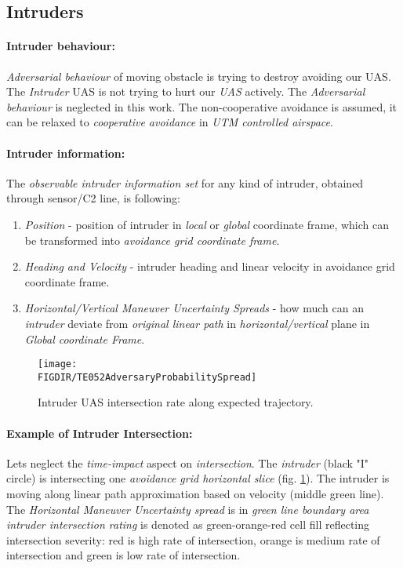 \subsection{Intruders}\label{s:intruders}
\paragraph{Intruder behaviour:} \emph{Adversarial behaviour} of moving obstacle is trying to destroy avoiding our UAS.  The \emph{Intruder} UAS \cite{fiorini1998motion} is not trying to hurt our \emph{UAS} actively. The \emph{Adversarial behaviour} is neglected in this work. The non-cooperative avoidance is assumed, it can be relaxed to \emph{cooperative avoidance} in \emph{UTM controlled airspace}.

\paragraph{Intruder information:} The \emph{observable intruder information set} for any kind of intruder, obtained through sensor/C2 line, is following:
\begin{enumerate}
    \item\emph{Position} - position of intruder in \emph{local} or \emph{global} coordinate frame, which can be transformed into \emph{avoidance grid coordinate frame}.
    
    \item\emph{Heading and Velocity} - intruder heading and linear velocity in avoidance grid coordinate frame.
    
    \item\emph{Horizontal/Vertical Maneuver Uncertainty Spreads} - how much can an \emph{intruder} deviate from \emph{original linear path} in \emph{horizontal/vertical} plane in \emph{Global coordinate Frame}.
\end{enumerate}

 

\begin{figure}[H]
    \centering
    \texttt{[image: \\FIGDIR/TE052AdversaryProbabilitySpread]}
    \caption{Intruder UAS intersection rate along expected trajectory.}
    \label{fig:intruderProbabiltySpreadTheoretical}
\end{figure}   

\paragraph{Example of Intruder Intersection:} Lets neglect the \emph{time-impact} aspect on \emph{intersection}.  The \emph{intruder} (black "I" circle) is intersecting one \emph{avoidance grid horizontal slice} (fig. \ref{fig:intruderProbabiltySpreadTheoretical}).  The intruder is moving along linear path approximation based on velocity (middle green line). The \emph{Horizontal Maneuver Uncertainty spread} is in \emph{green line boundary area} \emph{intruder intersection rating} is denoted as green-orange-red cell fill reflecting intersection severity:  red is high rate of intersection, orange is medium rate of intersection and green is low rate of intersection.
    


